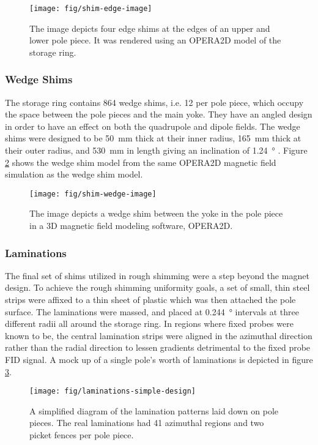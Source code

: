 \begin{figure}[h]
\centering
\texttt{[image: fig/shim-edge-image]}
\caption{
    The image depicts four edge shims at the edges of an upper and lower pole piece.  It was rendered using an OPERA2D model of the storage ring. 
    \label{fig:shim-edge-image}
}
\end{figure}

\subsubsection{Wedge Shims}
The storage ring contains 864 wedge shims, i.e. 12 per pole piece, which occupy the space between the pole pieces and the main yoke.  They have an angled design in order to have an effect on both the quadrupole and dipole fields.  The wedge shims were designed to be \SI{50}{\mm} thick at their inner radius, \SI{165}{\mm} thick at their outer radius, and \SI{530}{\mm} in length giving an inclination of \SI{1.24}{\degree} \cite{danby-magnet}.  Figure \ref{fig:shim-wedge-image} shows the wedge shim model from the same OPERA2D magnetic field simulation as the wedge shim model.

\begin{figure}[h]
\centering
\texttt{[image: fig/shim-wedge-image]}
\caption{
    The image depicts a wedge shim between the yoke in the pole piece in a 3D magnetic field modeling software, OPERA2D. 
    \label{fig:shim-wedge-image}
}
\end{figure}

\subsubsection{Laminations}
The final set of shims utilized in rough shimming were a step beyond the magnet design.  To achieve the rough shimming uniformity goals, a set of small, thin steel strips were affixed to a thin sheet of plastic which was then attached the pole surface.  The laminations were massed, and placed at \SI{0.244}{\degree} intervals at three different radii all around the storage ring.  In regions where fixed probes were known to be, the central lamination strips were aligned in the azimuthal direction rather than the radial direction to lessen gradients detrimental to the fixed probe FID signal.  A mock up of a single pole's worth of laminations is depicted in figure \ref{fig:laminations-simple-design}.

\begin{figure}[h]
\centering
\texttt{[image: fig/laminations-simple-design]}
\caption{
    A simplified diagram of the lamination patterns laid down on pole pieces.  The real laminations had 41 azimuthal regions and two picket fences per pole piece. 
    \label{fig:laminations-simple-design}
}
\end{figure}

